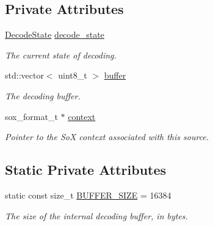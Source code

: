 \subsection*{Private Attributes}
\begin{DoxyCompactItemize}
\item 
\hyperlink{classAudioSource_a9a2f5de44325c84e69a7af1331aa159d}{Decode\+State} \hyperlink{classAudioSource_abe3899ebe685335a84c5bfee5a20a96f}{decode\+\_\+state}
\begin{DoxyCompactList}\small\item\em The current state of decoding. \end{DoxyCompactList}\item 
\hypertarget{classAudioSource_ad278f3b315e3ad91add683d5eda48a03}{std\+::vector$<$ uint8\+\_\+t $>$ \hyperlink{classAudioSource_ad278f3b315e3ad91add683d5eda48a03}{buffer}}\label{classAudioSource_ad278f3b315e3ad91add683d5eda48a03}

\begin{DoxyCompactList}\small\item\em The decoding buffer. \end{DoxyCompactList}\item 
\hypertarget{classAudioSource_a2bbce89d4bef9cf46b1113de3245655a}{sox\+\_\+format\+\_\+t $\ast$ \hyperlink{classAudioSource_a2bbce89d4bef9cf46b1113de3245655a}{context}}\label{classAudioSource_a2bbce89d4bef9cf46b1113de3245655a}

\begin{DoxyCompactList}\small\item\em Pointer to the So\+X context associated with this source. \end{DoxyCompactList}\end{DoxyCompactItemize}
\subsection*{Static Private Attributes}
\begin{DoxyCompactItemize}
\item 
\hypertarget{classAudioSource_a9c269c8d9c633bcd11d596c1ba3fd575}{static const size\+\_\+t \hyperlink{classAudioSource_a9c269c8d9c633bcd11d596c1ba3fd575}{B\+U\+F\+F\+E\+R\+\_\+\+S\+I\+Z\+E} = 16384}\label{classAudioSource_a9c269c8d9c633bcd11d596c1ba3fd575}

\begin{DoxyCompactList}\small\item\em The size of the internal decoding buffer, in bytes. \end{DoxyCompactList}\end{DoxyCompactItemize}


